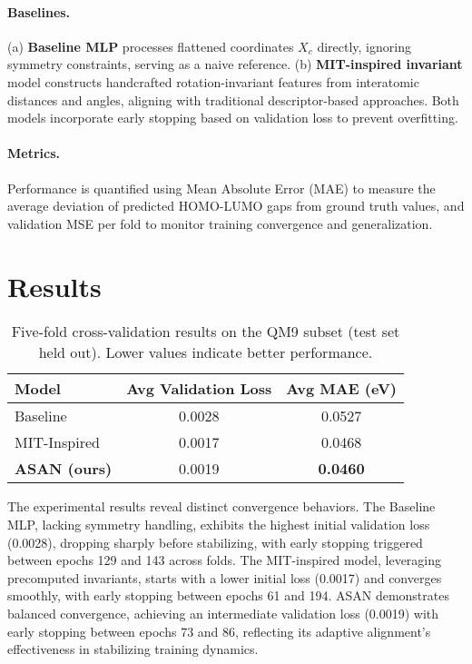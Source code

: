 \documentclass[12pt]{article}
\begin{document}
\paragraph{Baselines.} (a) \textbf{Baseline MLP} processes flattened coordinates $X_c$ directly, ignoring symmetry constraints, serving as a naive reference. (b) \textbf{MIT-inspired invariant} model constructs handcrafted rotation-invariant features from interatomic distances and angles, aligning with traditional descriptor-based approaches. Both models incorporate early stopping based on validation loss to prevent overfitting.

\paragraph{Metrics.} Performance is quantified using Mean Absolute Error (MAE) to measure the average deviation of predicted HOMO-LUMO gaps from ground truth values, and validation MSE per fold to monitor training convergence and generalization.

\section{Results}
\begin{table}[h]
  \centering
  \begin{tabular}{lcc}
    \toprule
    Model & Avg Validation Loss & Avg MAE (eV) \\
    \midrule
    Baseline & 0.0028 & 0.0527 \\
    MIT-Inspired & 0.0017 & 0.0468 \\
    \textbf{ASAN (ours)} & 0.0019 & \textbf{0.0460} \\
    \bottomrule
  \end{tabular}
  \caption{Five-fold cross-validation results on the QM9 subset (test set held out). Lower values indicate better performance.}
  \label{tab:main}
\end{table}

The experimental results reveal distinct convergence behaviors. The Baseline MLP, lacking symmetry handling, exhibits the highest initial validation loss (0.0028), dropping sharply before stabilizing, with early stopping triggered between epochs 129 and 143 across folds. The MIT-inspired model, leveraging precomputed invariants, starts with a lower initial loss (0.0017) and converges smoothly, with early stopping between epochs 61 and 194. ASAN demonstrates balanced convergence, achieving an intermediate validation loss (0.0019) with early stopping between epochs 73 and 86, reflecting its adaptive alignment's effectiveness in stabilizing training dynamics.
\end{document}
